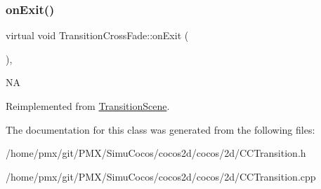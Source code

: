 \subsubsection{\texorpdfstring{on\+Exit()}{onExit()}\hspace{0.1cm}{\footnotesize\ttfamily [2/2]}}
{\footnotesize\ttfamily virtual void Transition\+Cross\+Fade\+::on\+Exit (\begin{DoxyParamCaption}{ }\end{DoxyParamCaption})\hspace{0.3cm}{\ttfamily [override]}, {\ttfamily [virtual]}}

NA 

Reimplemented from \hyperlink{classTransitionScene_a45e39b658189c79428a05c3bc3173bbb}{Transition\+Scene}.



The documentation for this class was generated from the following files\+:\begin{DoxyCompactItemize}
\item 
/home/pmx/git/\+P\+M\+X/\+Simu\+Cocos/cocos2d/cocos/2d/C\+C\+Transition.\+h\item 
/home/pmx/git/\+P\+M\+X/\+Simu\+Cocos/cocos2d/cocos/2d/C\+C\+Transition.\+cpp\end{DoxyCompactItemize}
